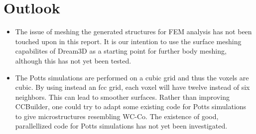 \documentclass[10pt,a4paper]{article}
\begin{document}
\section{Outlook}

\begin{itemize}
	\item The issue of meshing the generated structures for FEM analysis has not been touched upon in this report. It is our intention to use the surface meshing capabilites of Dream3D as a starting point for further body meshing, although this has not yet been tested.
	\item The Potts simulations are performed on a cubic grid and thus the voxels are cubic. By using instead an fcc grid, each voxel will have twelve instead of six neighbors. This can lead to smoother surfaces. Rather than improving CCBuilder, one could try to adapt some existing code for Potts simulations to give microstructures resembling WC-Co. The existence of good, parallellized code for Potts simulations has not yet been investigated.
\end{itemize}






\end{document}
